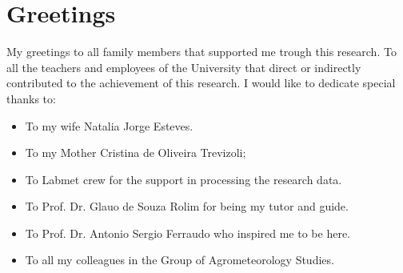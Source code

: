 \chapter*{Greetings}

\vspace*{-0.5cm}

My greetings to all family members that supported me trough this research. To all the teachers and employees of the University that direct or indirectly contributed to the achievement of this research. I would like to dedicate special thanks to:

\begin{itemize}
	\item To my wife Natalia Jorge Esteves.
	\item To my Mother Cristina de Oliveira Trevizoli;
	\item To Labmet crew for the support in processing the research data.
	\item To Prof. Dr. Glauo de Souza Rolim for being my tutor and guide.
	\item To Prof. Dr. Antonio Sergio Ferraudo who inspired me to be here.
	\item To all my colleagues in the Group of Agrometeorology Studies.
\end{itemize} 
